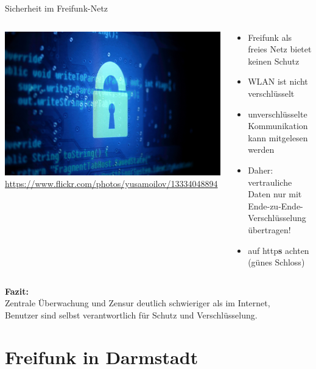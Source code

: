 \documentclass[10pt]{beamer}
\begin{document}
    \begin{frame}{Sicherheit im Freifunk-Netz}
      \begin{columns}[c]
        \begin{column}{5cm}
          \includegraphics[width=\textwidth]{images/lock}
          \newline \tiny \url{https://www.flickr.com/photos/yusamoilov/13334048894}
        \end{column}
        \begin{column}{7cm}
          \begin{itemize}
            \pause\item Freifunk als freies Netz bietet keinen Schutz
            \pause\item WLAN ist nicht verschlüsselt
            \pause\item unverschlüsselte Kommunikation kann mitgelesen werden
            \pause\item Daher: vertrauliche Daten nur mit Ende-zu-Ende-Verschlüsselung übertragen!
            \pause\item auf http\textbf{s} achten (günes Schloss)
          \end{itemize}
        \end{column}
      \end{columns}
      \vfill
      \pause
      \textbf{Fazit:}\\Zentrale Überwachung und Zensur deutlich schwieriger als im Internet, \\
      Benutzer sind selbst verantwortlich für Schutz und Verschlüsselung.
    \end{frame}



  \section{Freifunk in Darmstadt}
\end{document}
